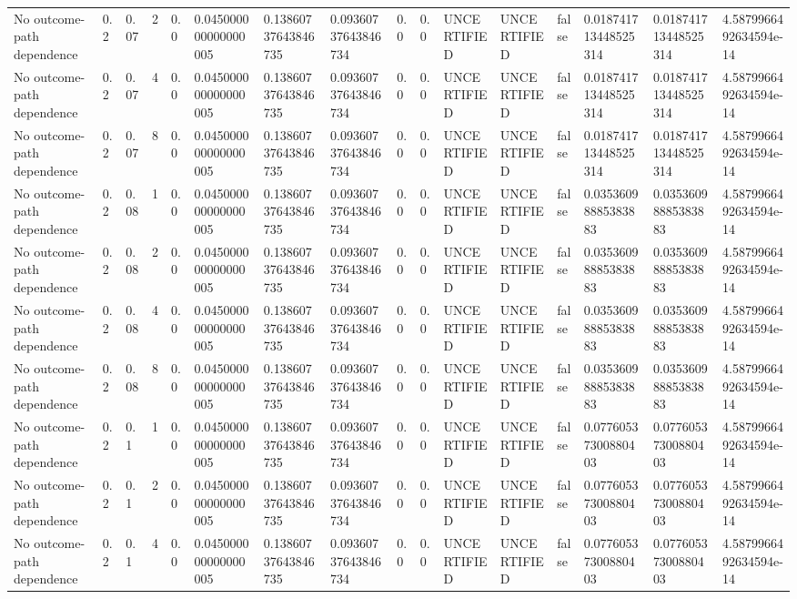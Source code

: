 \begin{tabular}{llllllllllllllll}
No outcome-path dependence & 0.2 & 0.07 & 2 & 0.0 & 0.045000000000000005 & 0.13860737643846735 & 0.09360737643846734 & 0.0 & 0.0 & UNCERTIFIED & UNCERTIFIED & false & 0.018741713448525314 & 0.018741713448525314 & 4.5879966492634594e-14 \\
No outcome-path dependence & 0.2 & 0.07 & 4 & 0.0 & 0.045000000000000005 & 0.13860737643846735 & 0.09360737643846734 & 0.0 & 0.0 & UNCERTIFIED & UNCERTIFIED & false & 0.018741713448525314 & 0.018741713448525314 & 4.5879966492634594e-14 \\
No outcome-path dependence & 0.2 & 0.07 & 8 & 0.0 & 0.045000000000000005 & 0.13860737643846735 & 0.09360737643846734 & 0.0 & 0.0 & UNCERTIFIED & UNCERTIFIED & false & 0.018741713448525314 & 0.018741713448525314 & 4.5879966492634594e-14 \\
No outcome-path dependence & 0.2 & 0.08 & 1 & 0.0 & 0.045000000000000005 & 0.13860737643846735 & 0.09360737643846734 & 0.0 & 0.0 & UNCERTIFIED & UNCERTIFIED & false & 0.03536098885383883 & 0.03536098885383883 & 4.5879966492634594e-14 \\
No outcome-path dependence & 0.2 & 0.08 & 2 & 0.0 & 0.045000000000000005 & 0.13860737643846735 & 0.09360737643846734 & 0.0 & 0.0 & UNCERTIFIED & UNCERTIFIED & false & 0.03536098885383883 & 0.03536098885383883 & 4.5879966492634594e-14 \\
No outcome-path dependence & 0.2 & 0.08 & 4 & 0.0 & 0.045000000000000005 & 0.13860737643846735 & 0.09360737643846734 & 0.0 & 0.0 & UNCERTIFIED & UNCERTIFIED & false & 0.03536098885383883 & 0.03536098885383883 & 4.5879966492634594e-14 \\
No outcome-path dependence & 0.2 & 0.08 & 8 & 0.0 & 0.045000000000000005 & 0.13860737643846735 & 0.09360737643846734 & 0.0 & 0.0 & UNCERTIFIED & UNCERTIFIED & false & 0.03536098885383883 & 0.03536098885383883 & 4.5879966492634594e-14 \\
No outcome-path dependence & 0.2 & 0.1 & 1 & 0.0 & 0.045000000000000005 & 0.13860737643846735 & 0.09360737643846734 & 0.0 & 0.0 & UNCERTIFIED & UNCERTIFIED & false & 0.07760537300880403 & 0.07760537300880403 & 4.5879966492634594e-14 \\
No outcome-path dependence & 0.2 & 0.1 & 2 & 0.0 & 0.045000000000000005 & 0.13860737643846735 & 0.09360737643846734 & 0.0 & 0.0 & UNCERTIFIED & UNCERTIFIED & false & 0.07760537300880403 & 0.07760537300880403 & 4.5879966492634594e-14 \\
No outcome-path dependence & 0.2 & 0.1 & 4 & 0.0 & 0.045000000000000005 & 0.13860737643846735 & 0.09360737643846734 & 0.0 & 0.0 & UNCERTIFIED & UNCERTIFIED & false & 0.07760537300880403 & 0.07760537300880403 & 4.5879966492634594e-14 \\

\end{tabular}
